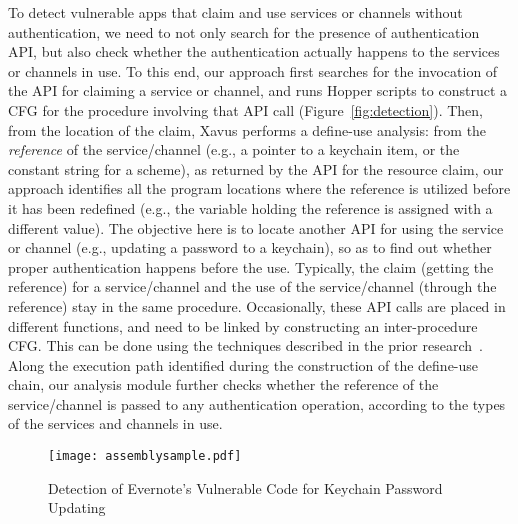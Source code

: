 \documentclass{article}
\newcommand{\ignore}[1]{}
\begin{document}
To detect vulnerable apps that claim and use services or channels without authentication, we need to not only search for the presence of authentication API, but also check whether the authentication actually happens to the services or channels in use. To this end, our approach first searches for the invocation of the API for claiming a service or channel, and runs Hopper scripts to construct a CFG for the procedure involving that API call (Figure~\ref{fig:detection}). Then, from the location of the claim, Xavus performs a define-use analysis: from the \textit{reference} of the service/channel (e.g., a pointer to a keychain item, or the constant string for a scheme), as returned by the API for the resource claim\ignore{(e.g., assembly code line 3 in Figure~\ref{fig:assembly_sample})}, our approach identifies all the program locations where the reference is utilized before it has been redefined (e.g., the variable holding the reference is assigned with a different value). The objective here is to locate another API for using the service or channel (e.g., updating a password to a keychain), so as to find out whether proper authentication happens before the use.  Typically, the claim (getting the reference) for a service/channel and the use of the service/channel (through the reference) stay in the same procedure. Occasionally, these API calls are placed in different functions, and need to be linked by constructing an inter-procedure CFG. This can be done using the techniques described in the prior research~\cite{egele11:pios}. Along the execution path identified during the construction of the define-use chain,  our analysis module further checks whether the reference of the service/channel is passed to any authentication operation, according to the types of the services and channels in use. \ignore{ Along the execution path identified during the construction of the define-use chain,  our analysis module further checks the presence of authentication operations which are associated with the reference of the service/channel, according to the types of the services and channels in use.}

\begin{figure}[h]
\centering
\vspace{-3pt}
\texttt{[image: assemblysample.pdf]}
\vspace{-10pt}
\caption{Detection of Evernote's Vulnerable Code for Keychain Password Updating}
\label{fig:assembly_sample}

\vspace{-4pt}
\end{figure} 
\end{document}
